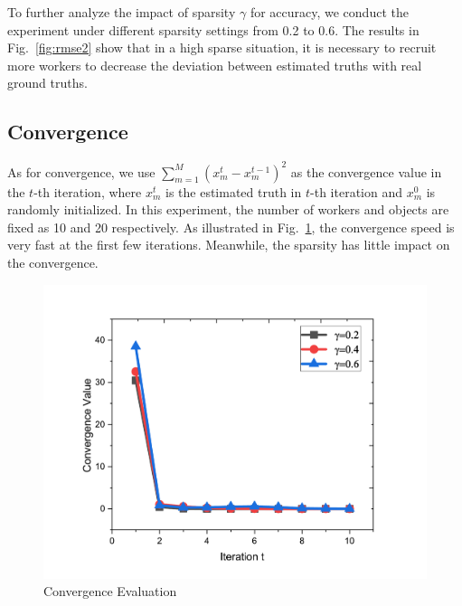 \documentclass[conference]{IEEEtran}
\begin{document}
To further analyze the impact of sparsity $\gamma$ for accuracy, we conduct the experiment under different sparsity settings from 0.2 to 0.6.
The results in Fig.~\ref{fig:rmse2} show that in a high sparse situation, it is necessary to recruit more workers to decrease the deviation between estimated truths with real ground truths.


\subsection{Convergence}
As for convergence, we use $\sum_{m=1}^M (x_m^t - x_m^{t-1})^2$ as the convergence value in the $t$-th iteration, where $x_m^t$ is the estimated truth in $t$-th iteration and $x_m^0$ is randomly initialized.
In this experiment, the number of workers and objects are fixed as 10 and 20 respectively.
As illustrated in Fig.~\ref{fig:conver}, the convergence speed is very fast at the first few iterations.
Meanwhile, the sparsity has little impact on the convergence.
\begin{figure}[htbp]
  \centering
  \includegraphics[width=0.75\linewidth]{figures/conver.pdf}
  \caption{Convergence Evaluation}
  \label{fig:conver}
\end{figure}
\end{document}
